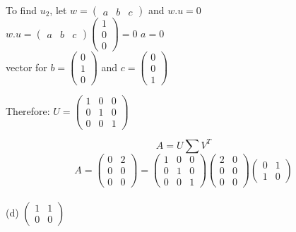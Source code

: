 \documentclass[12pt, oneside]{article}   	%
\begin{document}
\begin{enumerate}
	To find $u_2$, let $w=\left( \begin{array}{ccc} a&b&c  \end{array} \right)$ and $w.u=0$\\
	
	$w.u=\left( \begin{array}{ccc} a&b&c  \end{array} \right)\left( \begin{array}{c} 1\\0\\0 \end{array} \right)=0$
	$a=0$\\
	vector for $b=\left( \begin{array}{c} 0\\1\\0 \end{array} \right)$ and $c=\left( \begin{array}{c} 0\\0\\1 \end{array} \right)$
	
	Therefore:
	$U= \left( \begin{array}{ccc} 1&0&0 \\ 0& 1 &0\\ 0&0&1 \end{array} \right)$
	
	$$A=U\sum V^T$$
	$$A=\left( \begin{array}{cc} 0 & 2 \\ 0 & 0\\0&0  \end{array} \right)=\left( \begin{array}{ccc} 1&0&0 \\ 0& 1 &0\\ 0&0&1 \end{array} \right) \left( \begin{array}{cc} 2 & 0 \\ 0 & 0\\0&0  \end{array} \right) \left( \begin{array}{cc} 0 & 1 \\ 1 & 0  \end{array} \right)$$\\
	
	(d) $\left( \begin{array}{cc} 1 & 1 \\ 0 & 0  \end{array} \right)$  \quad\\
	

\end{enumerate}
\end{document}

